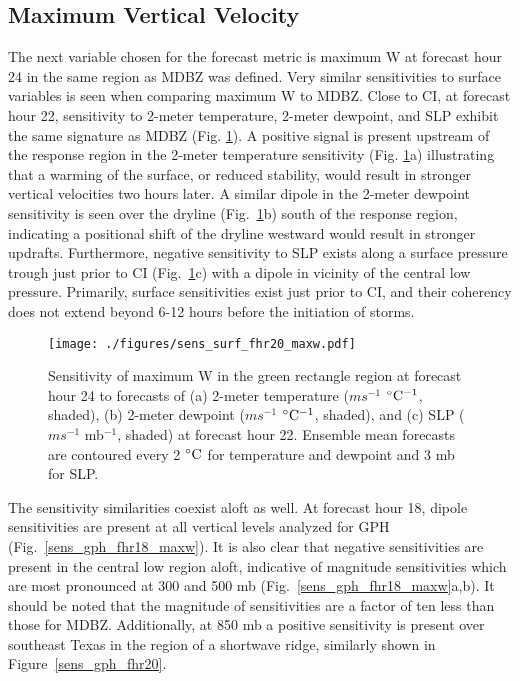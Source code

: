 \documentclass{ttuthes2007}
\newcommand{\tab}{\hspace*{2em}}  %
\begin{document}
\subsection{Maximum Vertical Velocity}

\tab The next variable chosen for the forecast metric is maximum W at forecast hour 24 in the same region as MDBZ was defined. Very similar sensitivities to surface variables is seen when comparing maximum W to MDBZ. Close to CI, at forecast hour 22, sensitivity to 2-meter temperature, 2-meter dewpoint, and SLP exhibit the same signature as MDBZ (Fig. \ref{sens_surf_fhr20_maxw}). A positive signal is present upstream of the response region in the 2-meter temperature sensitivity (Fig. \ref{sens_surf_fhr20_maxw}a) illustrating that a warming of the surface, or reduced stability, would result in stronger vertical velocities two hours later. A similar dipole in the 2-meter dewpoint sensitivity is seen over the dryline (Fig.~\ref{sens_surf_fhr20_maxw}b) south of the response region, indicating a positional shift of the dryline westward would result in stronger updrafts. Furthermore, negative sensitivity to SLP exists along a surface pressure trough just prior to CI (Fig.~\ref{sens_surf_fhr20_maxw}c) with a dipole in vicinity of the central low pressure. Primarily, surface sensitivities exist just prior to CI, and their coherency does not extend beyond 6-12 hours before the initiation of storms. 

\begin{figure}[!tb]
  \centering
  \noindent\texttt{[image: ./figures/sens\_surf\_fhr20\_maxw.pdf]}\\
  \caption{Sensitivity of maximum W in the green rectangle region at forecast hour 24 to forecasts of (a) 2-meter temperature ($m s^{-1}$ ${}^{\circ} {\rm C^{-1}}$, shaded), (b) 2-meter dewpoint ($m s^{-1}$ ${}^{\circ} {\rm C^{-1}}$, shaded), and (c) SLP ($m s^{-1}$ mb${}^{-1}$, shaded) at forecast hour 22. Ensemble mean forecasts are contoured every 2 ${}^{\circ} {\rm C}$ for temperature and dewpoint and 3 mb for SLP.}
\label{sens_surf_fhr20_maxw}
\end{figure}

\tab The sensitivity similarities coexist aloft as well. At forecast hour 18, dipole sensitivities are present at all vertical levels analyzed for GPH (Fig.~\ref{sens_gph_fhr18_maxw}). It is also clear that negative sensitivities are present in the central low region aloft, indicative of magnitude sensitivities which are most pronounced at 300 and 500 mb (Fig.~\ref{sens_gph_fhr18_maxw}a,b). It should be noted that the magnitude of sensitivities are a factor of ten less than those for MDBZ. Additionally, at 850 mb a positive sensitivity is present over southeast Texas in the region of a shortwave ridge, similarly shown in Figure~\ref{sens_gph_fhr20}. 
\end{document}
